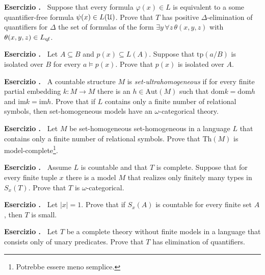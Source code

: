\documentclass[10pt]{article}
\def\phi{\varphi}
\def\U{\EuScript U}
\def\E{\exists}
\def\A{\forall}
\def\range{\textrm{im}}
\def\Aut{\textrm{Aut}}
\def\Th{\textrm{Th}}
\def\dom{\textrm{dom}}
\def\tp{\textrm{tp}}
\newcounter{ex}
\newenvironment{exercise}{\medskip\addtocounter{ex}{1}\textbf{Esercizio \theex.\ }}{}
\begin{document}
\begin{exercise}
  Suppose that every formula $\phi(x)\in L$ is equivalent to a some quantifier-free formula $\psi(x)\in L(\U)$.
  Prove that $T$ has positive $\Delta$-elimination of quantifiers for $\Delta$ the set of formulas of the form $\E y\,\A z\,\theta(x,y,z)$ with $\theta(x,y,z)\in L_{\rm qf}$.
\end{exercise}

\begin{exercise} 
  Let $A\subseteq B$ and $p(x)\subseteq L(A)$. 
  Suppose that $\tp(a/B)$ is isolated over $B$ for every $a\models p(x)$.
  Prove that $p(x)$ is isolated over $A$.
\end{exercise}

\begin{exercise}
  A countable structure $M$ is \textit{set-ultrahomogeneous\/} if for every finite partial embedding $k:M\to M$ there is an $h\in\Aut(M)$ such that $\dom k=\dom h$ and $\range k=\range h$.
  Prove that if $L$ contains only a finite number of relational symbols, then set-homogeneous models have an $\omega$-categorical theory.
\end{exercise}

\begin{exercise}
  Let $M$ be set-homogeneous set-homogeneous in a language $L$ that contains only a finite number of relational symbols.
  Prove that $\Th(M)$ is model-complete\footnote{Potrebbe essere meno semplice.}.
\end{exercise}

\begin{exercise} 
  Assume $L$ is countable and that $T$ is complete.
  Suppose that for every finite tuple $x$ there is a model $M$ that realizes only finitely many types in $S_x(T)$.
  Prove that $T$ is $\omega$-categorical.
\end{exercise}

\begin{exercise}
  Let $|x|=1$.
  Prove that if $S_{x}(A)$ is countable for every finite set $A$, then $T$ is small.
\end{exercise}

\begin{exercise}
  Let $T$ be a complete theory without finite models in a language that consists only of unary predicates. Prove that $T$ has elimination of quantifiers.
\end{exercise}
\end{document}
